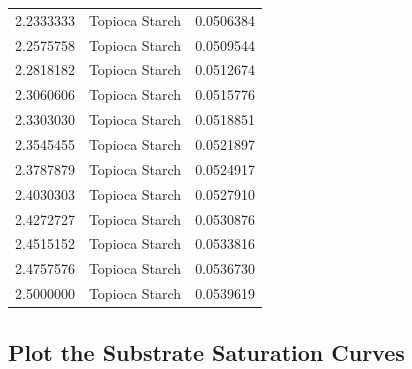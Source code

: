 \documentclass[
  12pt,
]{article}
\begin{document}
{\begin{longtable}[]{@{}rlr@{}}
2.2333333 & Topioca Starch & 0.0506384 \\
2.2575758 & Topioca Starch & 0.0509544 \\
2.2818182 & Topioca Starch & 0.0512674 \\
2.3060606 & Topioca Starch & 0.0515776 \\
2.3303030 & Topioca Starch & 0.0518851 \\
2.3545455 & Topioca Starch & 0.0521897 \\
2.3787879 & Topioca Starch & 0.0524917 \\
2.4030303 & Topioca Starch & 0.0527910 \\
2.4272727 & Topioca Starch & 0.0530876 \\
2.4515152 & Topioca Starch & 0.0533816 \\
2.4757576 & Topioca Starch & 0.0536730 \\
2.5000000 & Topioca Starch & 0.0539619 \\
\end{longtable}
}

\subsection{Plot the Substrate Saturation
Curves}\label{plot-the-substrate-saturation-curves}
\end{document}
